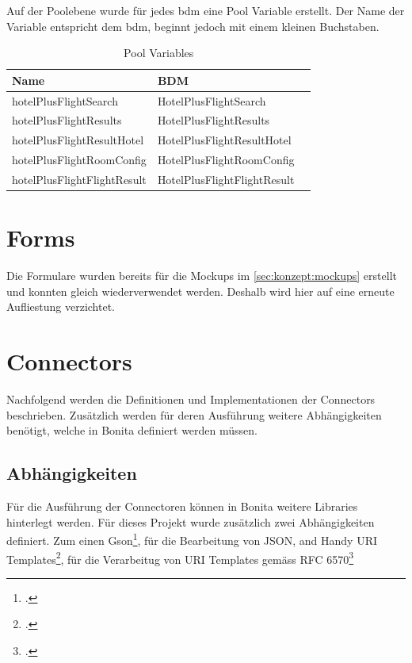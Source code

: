 Auf der Poolebene wurde für jedes \gls{bdm} eine Pool Variable erstellt. Der Name der Variable entspricht dem \gls{bdm}, beginnt jedoch mit einem kleinen Buchstaben.
\begin{table}[H] 
	\caption{Pool Variables}
	\centering
	\label{sec:umsetzung:bdm:poolvariable}
	
	\begin{tabular}{ | l | l | c | } 
		\hline
		\textbf{Name} & \textbf{BDM} \\ \hline 
		hotelPlusFlightSearch & HotelPlusFlightSearch \\ \hline
		hotelPlusFlightResults & HotelPlusFlightResults \\ \hline
		hotelPlusFlightResultHotel & HotelPlusFlightResultHotel \\ \hline
		hotelPlusFlightRoomConfig & HotelPlusFlightRoomConfig \\ \hline
	 	hotelPlusFlightFlightResult & HotelPlusFlightFlightResult \\ \hline
	\end{tabular} 
\end{table}
\section{Forms}
Die Formulare wurden bereits für die Mockups im \cref{sec:konzept:mockups}  erstellt und konnten gleich wiederverwendet werden. Deshalb wird hier auf eine erneute Aufliestung verzichtet.

\section{Connectors}
Nachfolgend werden die Definitionen und Implementationen der Connectors beschrieben. Zusätzlich werden für deren Ausführung weitere Abhängigkeiten benötigt, welche in Bonita definiert werden müssen.

\subsection{Abhängigkeiten}
Für die Ausführung der Connectoren können in Bonita weitere Libraries hinterlegt werden. Für dieses Projekt wurde zusätzlich zwei Abhängigkeiten definiert. Zum einen Gson\footcite{Gson_2016-06-12}, für die Bearbeitung von JSON, and Handy URI Templates\footcite{HandyUriTempaltes_2016-06-12}, für die Verarbeitug von URI Templates gemäss RFC 6570\footcite{RFC_6570_-_URI_Template_2016-06-21}

